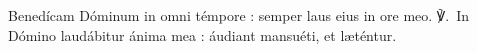 Benedícam Dóminum in omni témpore : semper laus eius in ore meo.
℣.~In Dómino laudábitur ánima mea : áudiant mansuéti, et læténtur.
